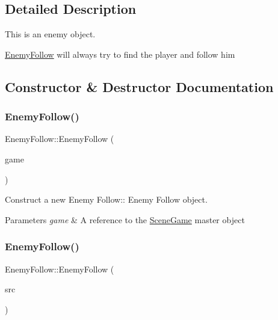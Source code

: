\subsection{Detailed Description}
This is an enemy object. 

\hyperlink{class_enemy_follow}{Enemy\+Follow} will always try to find the player and follow him 

\subsection{Constructor \& Destructor Documentation}
\mbox{\label{class_enemy_follow_a5dac0d66f1ea5a344ea4d73432c42e9d}} 
\subsubsection{\texorpdfstring{Enemy\+Follow()}{EnemyFollow()}\hspace{0.1cm}{\footnotesize\ttfamily [1/2]}}
{\footnotesize\ttfamily Enemy\+Follow\+::\+Enemy\+Follow (\begin{DoxyParamCaption}\item[{\hyperlink{class_scene_game}{Scene\+Game} \&}]{game }\end{DoxyParamCaption})\hspace{0.3cm}{\ttfamily [explicit]}}



Construct a new Enemy Follow\+:\+: Enemy Follow object. 


\begin{DoxyParams}{Parameters}
{\em game} & A reference to the \hyperlink{class_scene_game}{Scene\+Game} master object \\
\hline
\end{DoxyParams}
\mbox{\label{class_enemy_follow_a69648445aa5c2dbf8479729d05d530d1}} 
\subsubsection{\texorpdfstring{Enemy\+Follow()}{EnemyFollow()}\hspace{0.1cm}{\footnotesize\ttfamily [2/2]}}
{\footnotesize\ttfamily Enemy\+Follow\+::\+Enemy\+Follow (\begin{DoxyParamCaption}\item[{\hyperlink{class_enemy_follow}{Enemy\+Follow} const \&}]{src }\end{DoxyParamCaption})}



